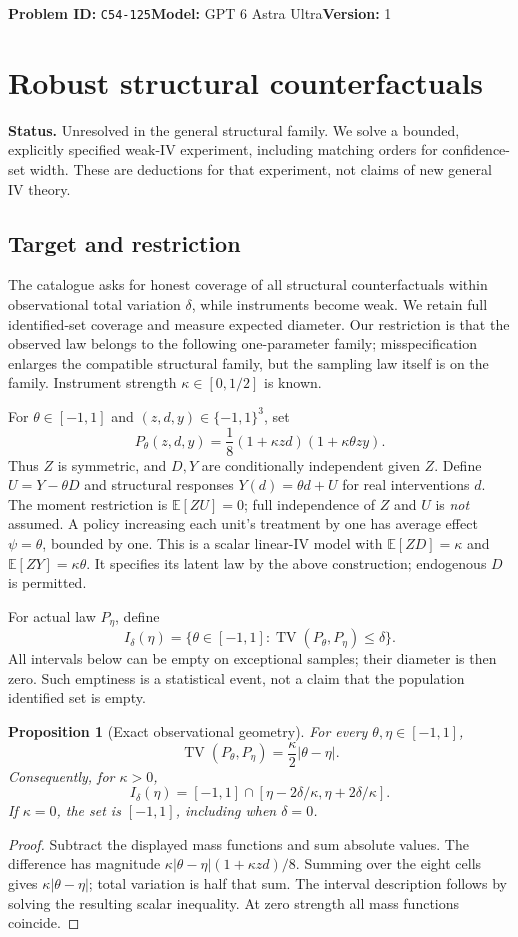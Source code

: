 \documentclass[11pt,a4paper]{article}
\newtheorem{proposition}[theorem]{Proposition}
\newcommand{\E}{\mathbb E}
\newcommand{\TV}{\operatorname{TV}}
\begin{document}
\noindent\textbf{Problem ID:} \texttt{C54-125}\quad\textbf{Model:} GPT 6 Astra Ultra\quad\textbf{Version:} 1\par
\section*{Robust structural counterfactuals}

\textbf{Status.} Unresolved in the general structural family. We solve a bounded, explicitly specified weak-IV experiment, including matching orders for confidence-set width. These are deductions for that experiment, not claims of new general IV theory.

\subsection*{Target and restriction}
The catalogue asks for honest coverage of all structural counterfactuals within observational total variation $\delta$, while instruments become weak. We retain full identified-set coverage and measure expected diameter. Our restriction is that the observed law belongs to the following one-parameter family; misspecification enlarges the compatible structural family, but the sampling law itself is on the family. Instrument strength $\kappa\in[0,1/2]$ is known.

For $\theta\in[-1,1]$ and $(z,d,y)\in\{-1,1\}^3$, set
\[
 P_\theta(z,d,y)=\frac18(1+\kappa zd)(1+\kappa\theta zy).
\]
Thus $Z$ is symmetric, and $D,Y$ are conditionally independent given $Z$. Define $U=Y-\theta D$ and structural responses $Y(d)=\theta d+U$ for real interventions $d$. The moment restriction is $\E[ZU]=0$; full independence of $Z$ and $U$ is \emph{not} assumed. A policy increasing each unit's treatment by one has average effect $\psi=\theta$, bounded by one. This is a scalar linear-IV model with $\E[ZD]=\kappa$ and $\E[ZY]=\kappa\theta$. It specifies its latent law by the above construction; endogenous $D$ is permitted.

For actual law $P_\eta$, define
\[
 I_\delta(\eta)=\{\theta\in[-1,1]:\TV(P_\theta,P_\eta)\leq\delta\}.
\]
All intervals below can be empty on exceptional samples; their diameter is then zero. Such emptiness is a statistical event, not a claim that the population identified set is empty.

\begin{proposition}[Exact observational geometry]
For every $\theta,\eta\in[-1,1]$,
\[
 \TV(P_\theta,P_\eta)=\frac\kappa2|\theta-\eta|.
\]
Consequently, for $\kappa>0$,
\[
 I_\delta(\eta)=[-1,1]\cap[\eta-2\delta/\kappa,\eta+2\delta/\kappa].
\]
If $\kappa=0$, the set is $[-1,1]$, including when $\delta=0$.
\end{proposition}
\begin{proof}
Subtract the displayed mass functions and sum absolute values. The difference has magnitude $\kappa|\theta-\eta|(1+\kappa zd)/8$. Summing over the eight cells gives $\kappa|\theta-\eta|$; total variation is half that sum. The interval description follows by solving the resulting scalar inequality. At zero strength all mass functions coincide.
\end{proof}
\end{document}
